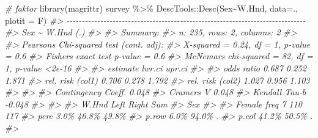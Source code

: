 \documentclass[
]{book}
\newenvironment{Shaded}{\begin{snugshade}}{\end{snugshade}}
\newcommand{\AttributeTok}[1]{\textcolor[rgb]{0.77,0.63,0.00}{#1}}
\newcommand{\CommentTok}[1]{\textcolor[rgb]{0.56,0.35,0.01}{\textit{#1}}}
\newcommand{\FunctionTok}[1]{\textcolor[rgb]{0.00,0.00,0.00}{#1}}
\newcommand{\NormalTok}[1]{#1}
\newcommand{\SpecialCharTok}[1]{\textcolor[rgb]{0.00,0.00,0.00}{#1}}
\begin{document}
\begin{Shaded}
\begin{Highlighting}[]
\CommentTok{\# faktor}
\FunctionTok{library}\NormalTok{(magrittr)}
\NormalTok{survey }\SpecialCharTok{\%\textgreater{}\%}\NormalTok{  DescTools}\SpecialCharTok{::}\FunctionTok{Desc}\NormalTok{(Sex}\SpecialCharTok{\textasciitilde{}}\NormalTok{W.Hnd, }\AttributeTok{data=}\NormalTok{., }\AttributeTok{plotit =}\NormalTok{ F)}
\CommentTok{\#\textgreater{} {-}{-}{-}{-}{-}{-}{-}{-}{-}{-}{-}{-}{-}{-}{-}{-}{-}{-}{-}{-}{-}{-}{-}{-}{-}{-}{-}{-}{-}{-}{-}{-}{-}{-}{-}{-}{-}{-}{-}{-}{-}{-}{-}{-}{-}{-}{-}{-}{-}{-}{-}{-}{-}{-}{-}{-}{-}{-}{-}{-}{-}{-}{-}{-}{-}{-}{-}{-}{-}{-}{-}{-}{-}{-}{-}{-}{-}{-} }
\CommentTok{\#\textgreater{} Sex \textasciitilde{} W.Hnd (.)}
\CommentTok{\#\textgreater{} }
\CommentTok{\#\textgreater{} Summary: }
\CommentTok{\#\textgreater{} n: 235, rows: 2, columns: 2}
\CommentTok{\#\textgreater{} }
\CommentTok{\#\textgreater{} Pearson\textquotesingle{}s Chi{-}squared test (cont. adj):}
\CommentTok{\#\textgreater{}   X{-}squared = 0.24, df = 1, p{-}value = 0.6}
\CommentTok{\#\textgreater{} Fisher\textquotesingle{}s exact test p{-}value = 0.6}
\CommentTok{\#\textgreater{} McNemar\textquotesingle{}s chi{-}squared = 82, df = 1, p{-}value \textless{}2e{-}16}
\CommentTok{\#\textgreater{} }
\CommentTok{\#\textgreater{}                     estimate lwr.ci upr.ci\textquotesingle{}}
\CommentTok{\#\textgreater{}                                           }
\CommentTok{\#\textgreater{} odds ratio             0.687  0.252  1.871}
\CommentTok{\#\textgreater{} rel. risk (col1)       0.706  0.278  1.792}
\CommentTok{\#\textgreater{} rel. risk (col2)       1.027  0.956  1.103}
\CommentTok{\#\textgreater{} }
\CommentTok{\#\textgreater{} }
\CommentTok{\#\textgreater{} Contingency Coeff.     0.048}
\CommentTok{\#\textgreater{} Cramer\textquotesingle{}s V             0.048}
\CommentTok{\#\textgreater{} Kendall Tau{-}b          {-}0.048}
\CommentTok{\#\textgreater{} }
\CommentTok{\#\textgreater{}                                     }
\CommentTok{\#\textgreater{}          W.Hnd   Left   Right    Sum}
\CommentTok{\#\textgreater{} Sex                                 }
\CommentTok{\#\textgreater{}                                     }
\CommentTok{\#\textgreater{} Female   freq       7     110    117}
\CommentTok{\#\textgreater{}          perc    3.0\%   46.8\%  49.8\%}
\CommentTok{\#\textgreater{}          p.row   6.0\%   94.0\%      .}
\CommentTok{\#\textgreater{}          p.col  41.2\%   50.5\%      .}
\CommentTok{\#\textgreater{}                                     }

\end{Highlighting}
\end{Shaded}
\end{document}

